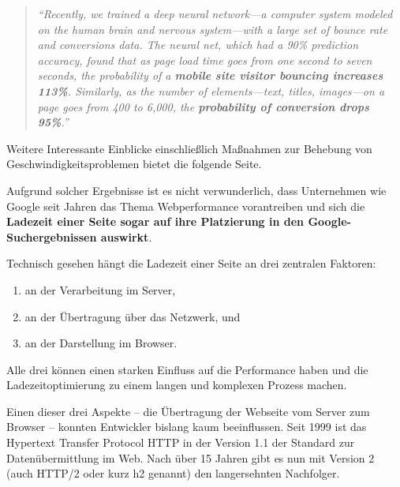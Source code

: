 \documentclass[a4paper, justified, notoc]{tufte-handout} %
\begin{document}
\begin{quote}
	\emph{``Recently, we trained a deep neural network—a computer system modeled on the human brain and nervous system—with a large set of bounce rate and conversions data. The neural net, which had a 90\% prediction accuracy, found that as page load time goes from one second to seven seconds, the probability of a \textbf{mobile site visitor bouncing increases 113\%}. Similarly, as the number of elements—text, titles, images—on a page goes from 400 to 6,000, the \textbf{probability of conversion drops 95\%}.''}
\end{quote}

Weitere Interessante Einblicke einschließlich Maßnahmen zur Behebung von Geschwindigkeitsproblemen bietet die folgende Seite.

Aufgrund solcher Ergebnisse ist es nicht verwunderlich, dass Unternehmen wie Google seit Jahren das Thema Webperformance vorantreiben und sich die \textbf{Ladezeit einer Seite sogar auf ihre Platzierung in den Google-Suchergebnissen auswirkt}.

Technisch gesehen hängt die Ladezeit einer Seite an drei zentralen Faktoren: 
\begin{enumerate}
	\item an der Verarbeitung im Server, 
	\item an der Übertragung über das Netzwerk, und 
	\item an der Darstellung im Browser.
\end{enumerate} 
Alle drei können einen starken Einfluss auf die Performance haben und die Ladezeitoptimierung zu einem langen und komplexen Prozess machen.

Einen dieser drei Aspekte -- die Übertragung der Webseite vom Server zum Browser -- konnten Entwickler bislang kaum beeinflussen. Seit 1999 ist das Hypertext Transfer Protocol HTTP in der Version 1.1 der Standard zur Datenübermittlung im Web. Nach über 15 Jahren gibt es nun mit Version 2 (auch HTTP/2 oder kurz h2 genannt) den langersehnten Nachfolger. 
\end{document}
